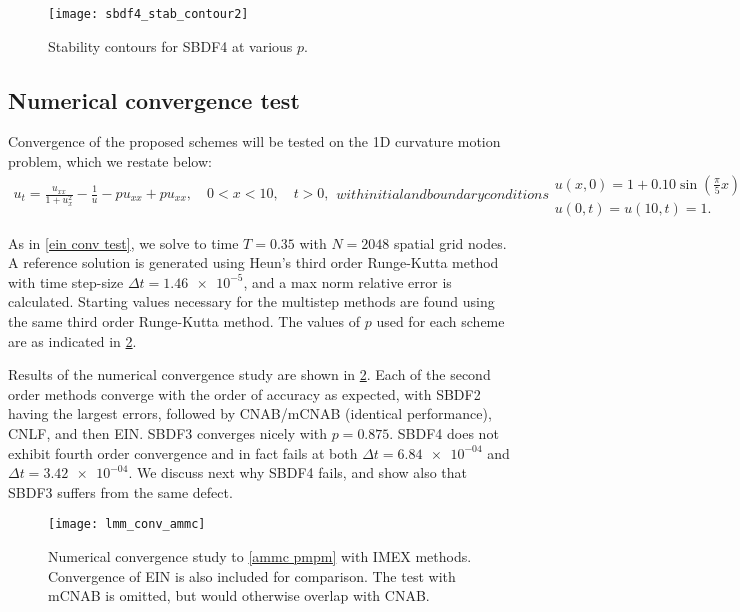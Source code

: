 \begin{figure}[htb!]
        \centering
\texttt{[image: sbdf4\_stab\_contour2]}
\caption{Stability contours for SBDF4 at various $p$.}
\label{sbdf4 contours}
\end{figure}

\subsection{Numerical convergence test}
Convergence of the proposed schemes will be tested on the 1D curvature motion problem, which we restate below:
\begin{subequations}
\begin{align}
        u_t = \frac{u_{xx}}{1 + u_x^2} - \frac{1}{u} - pu_{xx} + pu_{xx},
\quad 0< x< 10,\quad t>0,
\end{align}
with initial and boundary conditions
\begin{gather}
        u(x,0) = 1 + 0.10\sin\left(\frac{\pi}{5}x \right) 
\\
u(0,t) = u(10,t) = 1.
\end{gather}
\label{ammc pmpm}
\end{subequations}

As in \cref{ein conv test}, we solve to time $T=0.35$ with $N=2048$ spatial grid nodes. A reference solution is generated using Heun's third order Runge-Kutta method \cite{hundsdorfer2013numerical} with time step-size $\Delta t = \num{1.46e-5}$, and a max norm relative error is calculated. Starting values necessary for the multistep methods are found using the same third order Runge-Kutta method. The values of $p$ used for each scheme are as indicated in \cref{lmm conv test}.

Results of the numerical convergence study are shown in \cref{lmm conv test}. Each of the second order methods converge with the order of accuracy as expected, with SBDF2 having the largest errors, followed by CNAB/mCNAB (identical performance), CNLF, and then EIN. SBDF3 converges nicely with $p=0.875$. SBDF4 does not exhibit fourth order convergence and in fact fails at both $\Delta t =\num{6.84e-04}$ and $\Delta t=\num{3.42e-04}$. We discuss next why SBDF4 fails, and show also that SBDF3 suffers from the same defect.

\begin{figure}
        \centering
\texttt{[image: lmm\_conv\_ammc]}
\caption[Numerical convergence study with IMEX methods.]{Numerical convergence study to \cref{ammc pmpm} with IMEX methods. Convergence of EIN is also included for comparison. The test with mCNAB is omitted, but would otherwise overlap with CNAB.}
\label{lmm conv test}
\end{figure}

